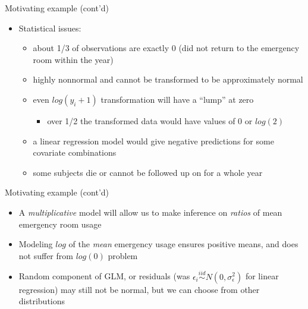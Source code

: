 \documentclass[ignorenonframetext,]{beamer}
\providecommand{\tightlist}{%
  \setlength{\itemsep}{0pt}\setlength{\parskip}{0pt}}
\begin{document}
\begin{frame}{Motivating example (cont'd)}

\begin{itemize}
\tightlist
\item
  Statistical issues:

  \begin{itemize}
  \tightlist
  \item
    about 1/3 of observations are exactly 0 (did not return to the
    emergency room within the year)
  \item
    highly nonnormal and cannot be transformed to be approximately
    normal
  \item
    even \(log(y_i + 1)\) transformation will have a ``lump'' at zero

    \begin{itemize}
    \tightlist
    \item
      over 1/2 the transformed data would have values of 0 or \(log(2)\)
    \end{itemize}
  \item
    a linear regression model would give negative predictions for some
    covariate combinations
  \item
    some subjects die or cannot be followed up on for a whole year
  \end{itemize}
\end{itemize}

\end{frame}

\begin{frame}{Motivating example (cont'd)}

\begin{itemize}
\tightlist
\item
  A \emph{multiplicative} model will allow us to make inference on
  \emph{ratios} of mean emergency room usage
\item
  Modeling \(log\) of the \emph{mean} emergency usage ensures positive
  means, and does not suffer from \(log(0)\) problem
\item
  Random component of GLM, or residuals (was
  \(\epsilon_i \stackrel{iid}{\sim} N(0, \sigma_\epsilon^2)\) for linear
  regression) may still not be normal, but we can choose from other
  distributions
\end{itemize}

\end{frame}
\end{document}
